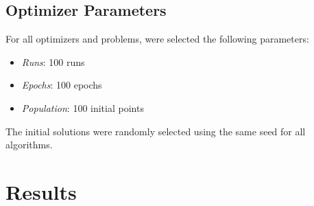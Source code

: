 \documentclass[conference]{IEEEtran}
\begin{document}
\subsection{Optimizer Parameters}
\label{subsec:methodology-optimizer-parameters}

For all optimizers and problems, were selected the following parameters:

\begin{itemize}
    \item \textit{Runs}: 100 runs
    \item \textit{Epochs}: 100 epochs
    \item \textit{Population}: 100 initial points
\end{itemize}

The initial solutions were randomly selected using the same seed for all algorithms.

\section{Results}
\label{sec:results}
\end{document}
